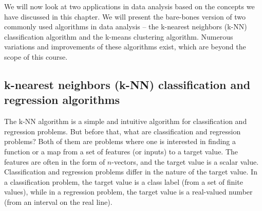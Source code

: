 We will now look at two applications in data analysis based on the concepts we have discussed in this chapter. We will present the bare-bones version of two commonly used algorithms in data analysis -- the k-nearest neighbors (k-NN) classification algorithm and the k-means clustering algorithm. Numerous variations and improvements of these algorithms exist, which are beyond the scope of this course.

\subsection{k-nearest neighbors (k-NN) classification and regression algorithms}
The k-NN algorithm is a simple and intuitive algorithm for classification and regression problems. But before that, what are classification and regression problems? Both of them are problems where one is interested in finding a function or a map from a set of features (or inputs) to a target value. The features are often in the form of $n$-vectors, and the target value is a scalar value. Classification and regression problems differ in the nature of the target value. In a classification problem, the target value is a class label (from a set of finite values), while in a regression problem, the target value is a real-valued number (from an interval on the real line).

